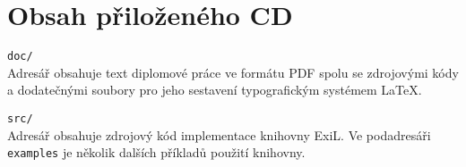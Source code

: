 \section{Obsah přiloženého CD}

\hangindent=1cm
\parskip=0.3cm
\noindent{}\verb|doc/| \\
Adresář obsahuje text diplomové práce ve formátu PDF spolu se zdrojovými kódy a
dodatečnými soubory pro jeho sestavení typografickým systémem \LaTeX.

\hangindent=1cm
\noindent{}\verb|src/| \\
Adresář obsahuje zdrojový kód implementace knihovny ExiL. Ve podadresáři
\verb|examples| je několik dalších příkladů použití knihovny.

